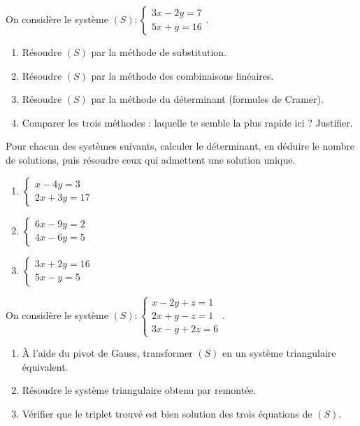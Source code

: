 \documentclass[11pt]{article}
\newcommand{\cle}[1]{{\popxbold\color{popdark}#1}}
\newcounter{popsec}
\newcounter{popsub}
\newcommand{\courssub}[1]{%
  \stepcounter{popsub}%
  \par\vspace{9pt}\noindent{\popxbold\fontsize{11.5}{13}\selectfont\color{popink}{\color{poporange}\thepopsec.\thepopsub}\hspace{6pt}#1}\par\nopagebreak\vspace{4pt}
}
\begin{document}
\courssub{Je m'entraîne}

\begin{exercice}
On considère le système $(S) : \begin{cases} 3x - 2y = 7 \\ 5x + y = 16 \end{cases}$.
\begin{enumerate}
\item Résoudre $(S)$ par la méthode de \cle{substitution}.
\item Résoudre $(S)$ par la méthode des \cle{combinaisons linéaires}.
\item Résoudre $(S)$ par la méthode du \cle{déterminant} (formules de Cramer).
\item Comparer les trois méthodes : laquelle te semble la plus rapide ici ? Justifier.
\end{enumerate}
\end{exercice}

\begin{exercice}
Pour chacun des systèmes suivants, calculer le déterminant, en déduire le nombre de solutions, puis résoudre ceux qui admettent une solution unique.
\begin{enumerate}
\item $\begin{cases} x - 4y = 3 \\ 2x + 3y = 17 \end{cases}$ \qquad \item $\begin{cases} 6x - 9y = 2 \\ 4x - 6y = 5 \end{cases}$ \qquad \item $\begin{cases} 3x + 2y = 16 \\ 5x - y = 5 \end{cases}$
\end{enumerate}
\end{exercice}

\begin{exercice}
On considère le système $(S) : \begin{cases} x - 2y + z = 1 \\ 2x + y - z = 1 \\ 3x - y + 2z = 6 \end{cases}$.
\begin{enumerate}
\item À l'aide du pivot de Gauss, transformer $(S)$ en un système triangulaire équivalent.
\item Résoudre le système triangulaire obtenu par remontée.
\item Vérifier que le triplet trouvé est bien solution des trois équations de $(S)$.
\end{enumerate}
\end{exercice}
\end{document}
